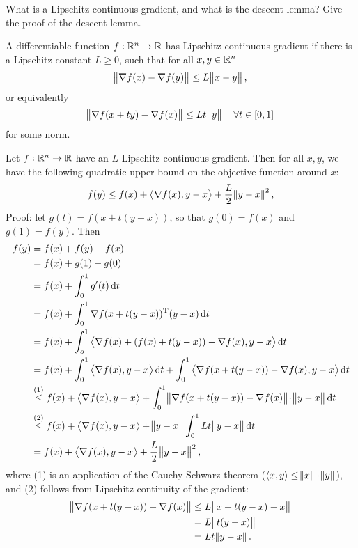 \documentclass{article}
\begin{document}
\begin{question}
  What is a Lipschitz continuous gradient, and what is the descent lemma?  Give the proof of the
  descent lemma.
\end{question}

A differentiable function \(f: \mathbb{R}^n \to \mathbb{R}\) has Lipschitz continuous gradient if there is a
Lipschitz constant \(L \geq 0\), such that for all \(x, y \in \mathbb{R}^n\)
\begin{equation*}
  \enVert{\nabla f(x) - \nabla f(y)} \leq L \enVert[1]{x - y},
\end{equation*}
or equivalently
\begin{equation*}
  \enVert{\nabla f(x + ty) - \nabla f(x)} \leq Lt \enVert[1]{y} \quad \forall t \in [0, 1]
\end{equation*}
for some norm.

Let \(f: \mathbb{R}^n \to \mathbb{R}\) have an \(L\)-Lipschitz continuous gradient.  Then for all \(x, y\), we
have the following quadratic upper bound on the objective function around \(x\):
\begin{equation*}
  f(y) \leq f(x) + \iprod{\nabla f(x)}{y - x} + \frac{L}{2}\enVert{y - x}^2,
\end{equation*}
Proof: let \(g(t) = f(x + t(y - x))\), so that \(g(0) = f(x)\) and \(g(1) = f(y)\). Then
\begin{align*}
  f(y) &= f(x) + f(y) - f(x) \\
       &= f(x) + g(1) - g(0) \\
       &= f(x) + \int_0^1 g'(t) \dif t \\
       &= f(x) + \int_0^1 \T{\nabla f(x + t(y - x))} (y - x) \dif t \\
       &= f(x) + \int_o^1 \iprod{\nabla f(x) + (f(x) + t(y - x)) - \nabla f(x)}{y - x} \dif t \\
       &= f(x) + \int_0^1 \iprod{\nabla f(x)}{y - x} \dif t
         + \int_0^1 \iprod{\nabla f(x + t(y - x)) - \nabla f(x)}{y - x} \dif t \\
       &\overset{(1)}{\leq} f(x) + \iprod{\nabla f(x)}{y - x}
         + \int_0^1 \enVert[1]{\nabla f(x + t(y - x)) - \nabla f(x)}\! \cdot \enVert[1]{y - x} \dif t \\
       &\overset{(2)}{\leq} f(x) + \iprod{\nabla f(x)}{y - x} + \enVert[1]{y - x} \int_0^1 Lt\enVert[1]{y - x} \dif t \\
       &= f(x) + \iprod{\nabla f(x)}{y - x} + \frac{L}{2}\enVert[1]{y - x}^2,
\end{align*}
where (1) is an application of the Cauchy-Schwarz theorem
(\(\langle x, y \rangle \leq \enVert{x} \cdot \enVert{y}\)), and (2) follows from Lipschitz
continuity of the gradient:
\begin{align*}
  \enVert{\nabla f(x + t(y - x)) - \nabla f(x)} &\leq L \enVert{x + t(y - x) - x} \\
                                                &= L \enVert{t(y - x)} \\
                                                &= Lt \enVert{y - x}.
\end{align*}
\end{document}
